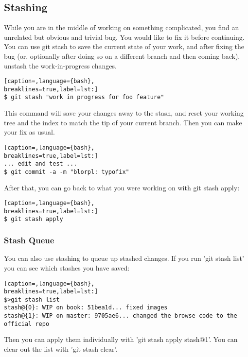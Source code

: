 \subsection{Stashing}
While you are in the middle of working on something complicated, you find an
unrelated but obvious and trivial bug. You would like to fix it before
continuing. You can use git stash to save the current state of your work, and
after fixing the bug (or, optionally after doing so on a different branch and
then coming back), unstash the work-in-progress changes.
\lstset{basicstyle=\scriptsize, numbers=none, captionpos=b, tabsize=4}
\begin{lstlisting}[caption=,language={bash},
breaklines=true,label=lst:]
$ git stash "work in progress for foo feature"
\end{lstlisting}

This command will save your changes away to the stash, and reset your working
tree and the index to match the tip of your current branch. Then you can make
your fix as usual.
\lstset{basicstyle=\scriptsize, numbers=none, captionpos=b, tabsize=4}
\begin{lstlisting}[caption=,language={bash},
breaklines=true,label=lst:]
... edit and test ...
$ git commit -a -m "blorpl: typofix"
\end{lstlisting}

After that, you can go back to what you were working on with git stash apply:
\lstset{basicstyle=\scriptsize, numbers=none, captionpos=b, tabsize=4}
\begin{lstlisting}[caption=,language={bash},
breaklines=true,label=lst:]
$ git stash apply
\end{lstlisting}

\subsubsection{Stash Queue}
You can also use stashing to queue up stashed changes.  If you run 'git stash
list' you can see which stashes you have saved:
\lstset{basicstyle=\scriptsize, numbers=none, captionpos=b, tabsize=4}
\begin{lstlisting}[caption=,language={bash},
breaklines=true,label=lst:]
$>git stash list
stash@{0}: WIP on book: 51bea1d... fixed images
stash@{1}: WIP on master: 9705ae6... changed the browse code to the official repo
\end{lstlisting}

Then you can apply them individually with 'git stash apply stash@{1}'. You can
clear out the list with 'git stash clear'.
